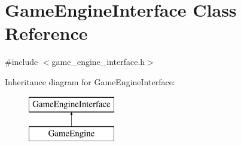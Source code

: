 \hypertarget{classGameEngineInterface}{\section{Game\-Engine\-Interface Class Reference}
\label{classGameEngineInterface}
}


{\ttfamily \#include $<$game\-\_\-engine\-\_\-interface.\-h$>$}

Inheritance diagram for Game\-Engine\-Interface\-:\begin{figure}[H]
\begin{center}
\leavevmode
\includegraphics[height=2.000000cm]{classGameEngineInterface}
\end{center}
\end{figure}
